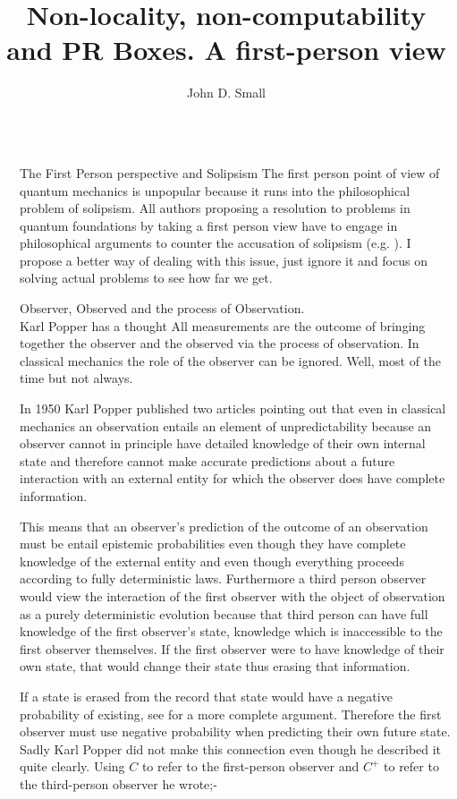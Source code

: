 \documentclass[final]{beamer}
\title{Non-locality, non-computability and PR Boxes. A first-person view}
\author{John D. Small}
\newlength{\sepwidth}
\newlength{\colwidth}
\newcommand{\separatorcolumn}{\begin{column}{\sepwidth}\end{column}}
\begin{document}
\begin{frame}[t]
\begin{columns}[t]
\separatorcolumn

\begin{column}{\colwidth}
  \begin{block}{The First Person perspective and Solipsism}
    The first person point of view of quantum mechanics is unpopular because it runs into the philosophical problem of solipsism. All authors proposing a resolution to problems in quantum foundations by taking a first person view have to engage in philosophical arguments to counter the accusation of solipsism (e.g. \autocite{Mueller2017}). I propose a better way of dealing with this issue, just ignore it and focus on solving actual problems to see how far we get.  
\end{block}
\begin{block}{Observer, Observed and the process of Observation.\\ Karl Popper has a thought}
    All measurements are the outcome of bringing together the observer and the observed via the process of observation. In classical mechanics the role of the observer can be ignored. Well, most of the time but not always. 
    
    In 1950 Karl Popper published two articles \autocite{Popper1950IndeterminismI, Popper1950IndeterminismII} pointing out that even in classical mechanics an observation entails an element of unpredictability because an observer cannot in principle have detailed knowledge of their own internal state and therefore cannot make accurate predictions about a future interaction with an external entity for which the observer does have complete information.
    
    This means that an observer's prediction of the outcome of an observation must be entail epistemic probabilities even though they have complete knowledge of the external entity and even though everything proceeds according to fully deterministic laws. Furthermore a third person observer would view the interaction of the first observer with the object of observation as a purely deterministic evolution because that third person can have full knowledge of the first observer's state, knowledge which is inaccessible to the first observer themselves. If the first observer were to have knowledge of their own state, that would change their state thus erasing that information. 
    
    If a state is erased from the record that state would have a negative probability of existing, see \autocite{Burgin2013} for a more complete argument. Therefore the first observer must use negative probability when predicting their own future state. Sadly Karl Popper did not make this connection even though he described it quite clearly. Using $C$ to refer to the first-person observer and $C^{+}$ to refer to the third-person observer he wrote;-
    

\end{block}
\end{column}
\end{columns}
\end{frame}
\end{document}
